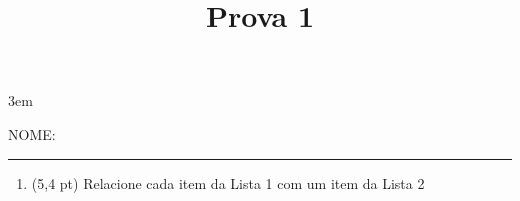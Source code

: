 \documentclass[a4paper,10pt]{article}
\title{Prova 1}
\begin{document}
\maketitle

\emergencystretch 3em



NOME: \rule{.85\textwidth}{0.1mm}

\begin{multicols*}{2}
\setlength{\leftmargini}{0pt}
\begin{enumerate}
  \item (5,4 pt) Relacione cada item da Lista 1 com um item da Lista 2


\end{enumerate}
\end{multicols*}
\end{document}
